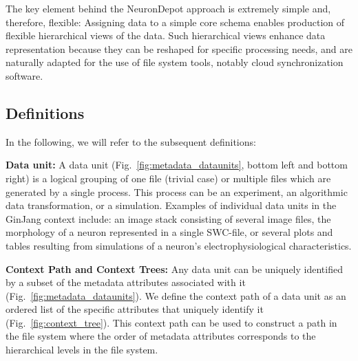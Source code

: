 \documentclass{frontiersSCNS} %
\begin{document}
The key element behind the NeuronDepot approach is extremely simple and,
therefore, flexible: Assigning data to a simple core schema enables production
of flexible hierarchical views of the data. Such hierarchical views enhance
data representation because they can be reshaped for specific processing needs,
and are naturally adapted for the use of file system tools, notably cloud
synchronization software.

\subsection{Definitions}

In the following, we will refer to the subsequent definitions:

\textbf{Data unit:} A data unit (Fig.~\ref{fig:metadata_dataunits}, bottom left
and bottom right) is a logical grouping of one file (trivial case) or multiple
files which are generated by a single process. This process can be an
experiment, an algorithmic data transformation, or a simulation. Examples of
individual data units in the GinJang context include: an image stack consisting
of several image files, the morphology of a neuron represented in a single
SWC-file, or several plots and tables resulting from simulations of a neuron's
electrophysiological characteristics.

\textbf{Context Path and Context Trees:} Any data unit can be uniquely
identified by a subset of the metadata attributes associated with it
(Fig.~\ref{fig:metadata_dataunits}). We define the context path of a data unit
as an ordered list of the specific attributes that uniquely identify it
(Fig.~\ref{fig:context_tree}). This context path can be used to construct a
path in the file system where the order of metadata attributes corresponds to
the hierarchical levels in the file system.
\end{document}
